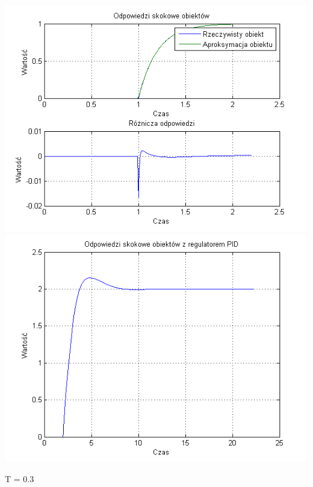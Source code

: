 \documentclass[10pt,a4paper]{article}
\begin{document}
\begin{center}
\includegraphics[scale=1]{images/dwa/skrypt_07.png}\\
\includegraphics[scale=1]{images/dwa/skrypt_08.png}\\
\end{center}
\newpage
T = 0.3
\end{document}
